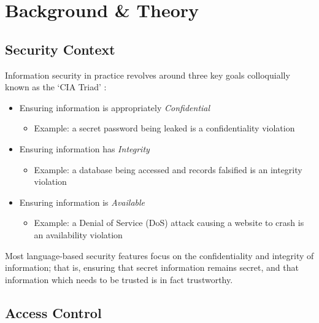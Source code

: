 \chapter{Background \& Theory} \label{chap_theory}

\section{Security Context}

Information security in practice revolves around three key goals colloquially known as the `CIA Triad' \cite{krutz2010cloudsec}:

\begin{itemize}
	\item Ensuring information is appropriately \textit{Confidential}

	\begin{itemize}
		\item Example: a secret password being leaked is a confidentiality violation
	\end{itemize}
	
	\item Ensuring information has \textit{Integrity}
	
	\begin{itemize}
		\item Example: a database being accessed and records falsified is an integrity violation
	\end{itemize}
	
	\item Ensuring information is \textit{Available}
	
	\begin{itemize}
		\item Example: a Denial of Service (DoS) attack causing a website to crash is an availability violation
	\end{itemize}

\end{itemize}

Most language-based security features focus on the confidentiality and integrity of information; that is, ensuring that secret information remains secret, and that information which needs to be trusted is in fact trustworthy.

\newpage

\section{Access Control}

